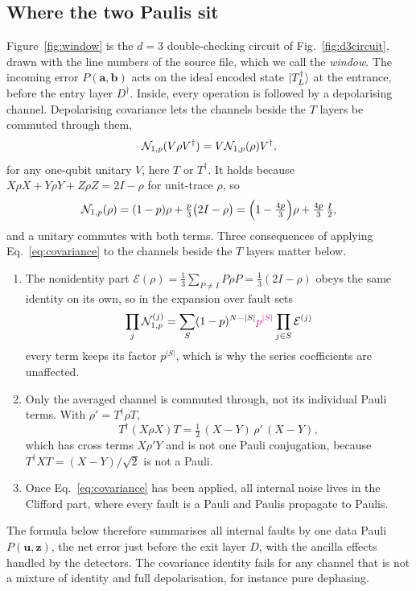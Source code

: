 \subsection{Where the two Paulis sit}\label{app:B-window}

Figure~\ref{fig:window} is the $d=3$ double-checking circuit of Fig.~\ref{fig:d3circuit}, drawn with the line numbers of the source file, which we call the \textit{window}.
The incoming error $P(\boldsymbol a,\boldsymbol b)$ acts on the ideal encoded state $\lvert T_L^\dagger\rangle$ at the entrance, before the entry layer $D^\dagger$. Inside, every operation is followed by a depolarising channel. Depolarising covariance lets the channels beside the $T$ layers be commuted through them,
\begin{equation}
 {\cal N}_{1,p}(V\rho V^\dagger)=V{\cal N}_{1,p}(\rho)V^\dagger ,
 \label{eq:covariance}
\end{equation}
for any one-qubit unitary $V$, here $T$ or $T^\dagger$. It holds because $X\rho X+Y\rho Y+Z\rho Z=2I-\rho$ for unit-trace $\rho$, so
\begin{equation}
 {\cal N}_{1,p}(\rho)=(1-p)\rho+\tfrac p3\big(2I-\rho\big)=\Big(1-\tfrac{4p}{3}\Big)\rho+\tfrac{4p}{3}\,\tfrac I2 ,
 \label{eq:nonidentity}
\end{equation}
and a unitary commutes with both terms. Three consequences of applying Eq.~\eqref{eq:covariance} to the channels beside the $T$ layers matter below.
\begin{enumerate}
\item The nonidentity part $\mathcal E(\rho)=\tfrac13\sum_{P\ne I}P\rho P=\tfrac13(2I-\rho)$ obeys the same identity on its own, so in the expansion over fault sets
\begin{equation}
 \prod_{j}\mathcal N^{(j)}_{1,p}=\sum_{S}(1-p)^{N-|S|}{\color{magenta}p^{|S|}}\prod_{j\in S}\mathcal E^{(j)}
 \label{eq:faultcount}
\end{equation}
every term keeps its factor {\color{magenta}$p^{|S|}$}, which is why the series coefficients are unaffected.
\item Only the averaged channel is commuted through, not its individual Pauli terms. With $\rho'=T^\dagger\rho T$,
\begin{equation}
 T^\dagger(X\rho X)T=\tfrac12\,(X-Y)\,\rho'\,(X-Y),
 \label{eq:singleterm}
\end{equation}
which has cross terms $X\rho'Y$ and is not one Pauli conjugation, because $T^\dagger XT=(X-Y)/\sqrt2$ is not a Pauli.
\item Once Eq.~\eqref{eq:covariance} has been applied, all internal noise lives in the Clifford part, where every fault is a Pauli and Paulis propagate to Paulis.
\end{enumerate}
The formula below therefore summarises all internal faults by one data Pauli $P(\boldsymbol u,\boldsymbol z)$, the net error just before the exit layer $D$, with the ancilla effects handled by the detectors. The covariance identity fails for any channel that is not a mixture of identity and full depolarisation, for instance pure dephasing.

